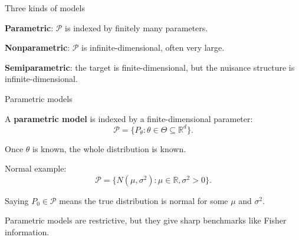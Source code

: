 \documentclass[xcolor={table}, handout]{beamer}
\begin{document}
\note{
\scriptsize \singlespacing

}
\begin{frame}{Three kinds of models}

\begin{wideitemize}
\item \textbf{Parametric}: $\mathcal{P}$ is indexed by finitely many parameters.\pause
\item \textbf{Nonparametric}: $\mathcal{P}$ is infinite-dimensional, often very large.\pause
\item \textbf{Semiparametric}: the target is finite-dimensional, but the nuisance structure is infinite-dimensional.
\end{wideitemize}

\end{frame}

\note{
\scriptsize \singlespacing

}
\begin{frame}{Parametric models}

\begin{wideitemize}
\item A \textbf{parametric model} is indexed by a finite-dimensional parameter:
\[
\mathcal{P}
  =
  \{P_\theta:\theta\in\Theta\subseteq\mathbb{R}^d\}.
\]\pause
\item Once $\theta$ is known, the whole distribution is known.\pause
\item Normal example:
\[
\mathcal{P}
  =
  \{N(\mu,\sigma^2):\mu\in\mathbb{R},\sigma^2>0\}.
\]\pause
\item Saying $P_0\in\mathcal{P}$ means the true distribution is normal for some $\mu$ and $\sigma^2$.\pause
\item Parametric models are restrictive, but they give sharp benchmarks like Fisher information.
\end{wideitemize}

\end{frame}
\end{document}
